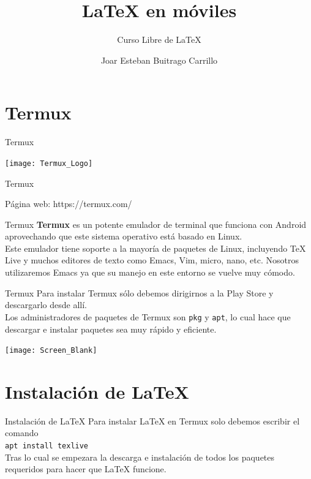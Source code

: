 \documentclass[12pt,aspectratio=43]{beamer}
\title{{\lmr\LaTeX} en móviles}
\subtitle{Curso Libre de {\lmr\LaTeX}}
\author{Joar Esteban Buitrago Carrillo}
\institute{Universidad Nacional de Colombia}
\date{}
\makeatletter
\newcommand{\lmr}{\fontfamily{lmr}\selectfont}
\newcommand{\ifratio}[2]{
	\ifthenelse
	{\lengthtest{\beamer@paperwidth=16cm} \AND \lengthtest{\beamer@paperheight=9cm}}
	{#1}
	{#2} }
\makeatother
\begin{document}
\begin{frame}[plain]
\titlepage
\end{frame}

{
\begin{frame}
\ifratio
	{}
	{}
\end{frame}
}

\section{Termux}
\begin{frame}{Termux}{}
\begin{center}
	\texttt{[image: Termux\_Logo]}\hspace{1em}\parbox[b][3cm][c]{\widthof{\Huge Termux}}{\Huge Termux}
\end{center}

Página web: https://termux.com/
\end{frame}

\begin{frame}{Termux}{}
\alert{\bf Termux} es un potente emulador de terminal que funciona con Android aprovechando que este sistema operativo está basado en Linux.\pause\\[1em]

Este emulador tiene soporte a la mayoría de paquetes de Linux, incluyendo {\lmr\TeX} Live y muchos editores de texto como Emacs, Vim, micro, nano, etc. Nosotros utilizaremos Emacs ya que su manejo en este entorno se vuelve muy cómodo.
\end{frame}

\begin{frame}{Termux}{}
Para instalar Termux sólo debemos dirigirnos a la Play Store y descargarlo desde allí.\pause\\[1em]

Los administradores de paquetes de Termux son \texttt{pkg} y \texttt{apt}, lo cual hace que descargar e instalar paquetes sea muy rápido y eficiente.
\end{frame}

\begin{frame}[plain]
\begin{center}
	\texttt{[image: Screen\_Blank]}
\end{center}
\end{frame}

\section{Instalación de {\LaTeX}}
\begin{frame}{Instalación de {\lmr\LaTeX}}{}
Para instalar {\lmr\LaTeX} en Termux solo debemos escribir el comando\\[1em]

\texttt{apt install texlive}\pause\\[1em]

Tras lo cual se empezara la descarga e instalación de todos los paquetes requeridos para hacer que {\lmr\LaTeX} funcione.
\end{frame}
\end{document}
